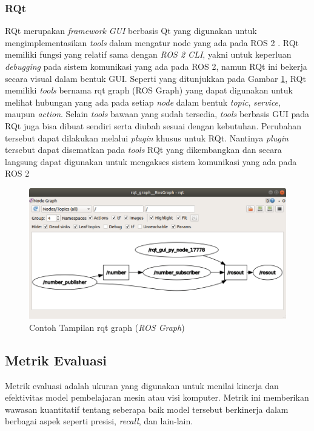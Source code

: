\subsubsection{RQt}
\label{subsubsec:rqt}

RQt merupakan \textit{framework} \textit{GUI} berbasis Qt yang digunakan untuk mengimplementasikan \textit{tools} dalam mengatur node yang
ada pada ROS 2 \parencite{url:rqt}. RQt memiliki fungsi yang relatif sama dengan \textit{ROS 2 CLI}, yakni untuk keperluan \textit{debugging} pada sistem
komunikasi yang ada pada ROS 2, namun RQt ini bekerja secara visual dalam bentuk GUI. Seperti yang ditunjukkan pada Gambar \ref{fig:rqtgraph}, RQt memiliki \textit{tools} bernama rqt graph (ROS Graph) yang dapat digunakan untuk melihat hubungan yang ada pada
setiap \textit{node} dalam bentuk \textit{topic}, \textit{service}, maupun \textit{action}. Selain \textit{tools} bawaan yang sudah tersedia, \textit{tools} berbasis GUI
pada RQt juga bisa dibuat sendiri serta diubah sesuai dengan kebutuhan. Perubahan tersebut dapat dilakukan melalui \textit{plugin} khusus untuk RQt. Nantinya
\textit{plugin} tersebut dapat disematkan pada \textit{tools} RQt yang dikembangkan dan secara langsung dapat digunakan untuk mengakses sistem komunikasi yang ada pada ROS 2
\begin{figure}[ht]
  \centering
  \includegraphics[scale=0.45]{gambar/rqt_graph.png}
  \caption{Contoh Tampilan rqt graph (\textit{ROS Graph})}
  \label{fig:rqtgraph}
\end{figure}


\subsection{ Metrik Evaluasi}
\label{subsec:evaluation-metrics}

Metrik evaluasi adalah ukuran yang digunakan untuk menilai kinerja dan efektivitas model pembelajaran mesin atau visi komputer. Metrik ini memberikan wawasan kuantitatif tentang seberapa baik model tersebut berkinerja dalam berbagai aspek seperti presisi, \textit{recall}, dan lain-lain.

